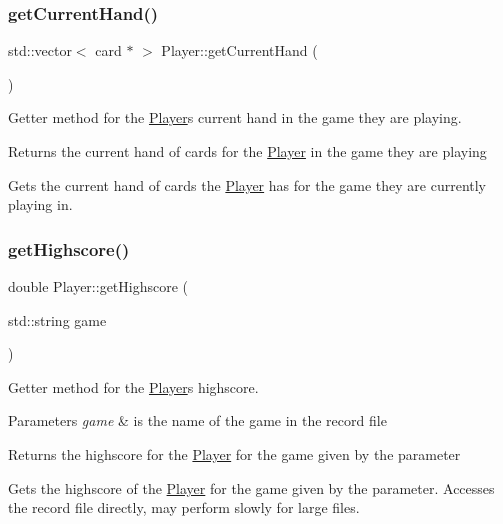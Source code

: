 \subsubsection{\texorpdfstring{get\+Current\+Hand()}{getCurrentHand()}}
{\footnotesize\ttfamily std\+::vector$<$ card $\ast$ $>$ Player\+::get\+Current\+Hand (\begin{DoxyParamCaption}{ }\end{DoxyParamCaption})}



Getter method for the \mbox{\hyperlink{class_player}{Player}}\textquotesingle{}s current hand in the game they are playing. 

\begin{DoxyReturn}{Returns}
the current hand of cards for the \mbox{\hyperlink{class_player}{Player}} in the game they are playing
\end{DoxyReturn}
Gets the current hand of cards the \mbox{\hyperlink{class_player}{Player}} has for the game they are currently playing in. \mbox{\label{class_player_a42286b7c54da75f7b64200796f149d4c}} 
\subsubsection{\texorpdfstring{get\+Highscore()}{getHighscore()}}
{\footnotesize\ttfamily double Player\+::get\+Highscore (\begin{DoxyParamCaption}\item[{std\+::string}]{game }\end{DoxyParamCaption})}



Getter method for the \mbox{\hyperlink{class_player}{Player}}\textquotesingle{}s highscore. 


\begin{DoxyParams}{Parameters}
{\em game} & is the name of the game in the record file \\
\hline
\end{DoxyParams}
\begin{DoxyReturn}{Returns}
the highscore for the \mbox{\hyperlink{class_player}{Player}} for the game given by the parameter
\end{DoxyReturn}
Gets the highscore of the \mbox{\hyperlink{class_player}{Player}} for the game given by the parameter. Accesses the record file directly, may perform slowly for large files. \mbox{\label{class_player_aef0e6355f59ecc9a72dfda313c603b5e}} 
